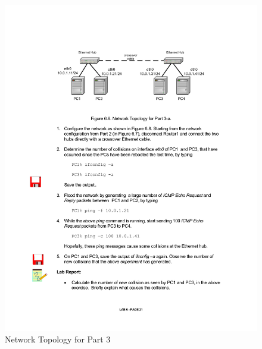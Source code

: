 \begin{figure}[h!t]
	\centering
	\includegraphics[width=\linewidth]{graphics/lab6-network3.pdf}
	\caption{Network Topology for Part 3}
	\label{fig:lab6-network3}
\end{figure}

